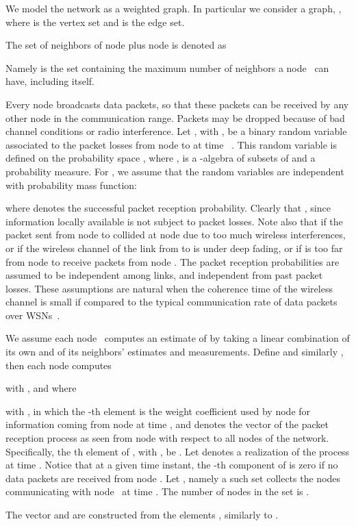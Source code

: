 \documentclass[a4paper,notitlepage,onecolumn]{article}
\numberwithin{equation}{section}
\begin{document}
We model the network as a weighted graph. In particular we consider
a graph, , where
 is the vertex set and
 is the edge set.


The set of neighbors of node  plus node  is
denoted as

Namely  is the set containing the maximum number of
neighbors a node~ can have, including itself.


Every node broadcasts data packets, so that these packets can be
received by any other node in the communication range. Packets may
be dropped because of bad channel conditions or radio
interference. Let , with , be a binary
random variable associated to the packet losses from node  to
 at time ~\cite{Stuber}. This random variable is defined on
the probability space , where
,  is a -algebra of subsets
of  and  a probability measure. For , we
assume that the random variables  are independent
with probability mass function:

where  denotes the successful packet reception
probability. Clearly that , since information locally
available is not subject to packet losses. Note also that
 if the packet sent from node  to  collided at
node  due to too much wireless interferences, or if the
wireless channel of the link from  to  is under deep fading,
or if  is too far from node  to receive packets from node
. The packet reception probabilities are assumed to be
independent among links, and independent from past packet losses.
These assumptions are natural when the coherence time of the
wireless channel is small if compared to the typical communication
rate of data packets over WSNs~\cite{Stuber,ieee802154}.


We assume each node~ computes an estimate  of
 by taking a linear combination of its own and of its
neighbors' estimates and measurements. Define  and similarly , then each node computes

with , and where

with , in which the -th element
is the weight coefficient used by node  for information coming
from node  at time , and  
denotes the vector of the packet reception process as seen from
node  with respect to all nodes of the network. Specifically,
the th element of , with , be
. Let  denotes a
realization of the process  at time . Notice that
at a given time instant, the -th component of 
is zero if no data packets are received from node . Let
, namely a such set collects the nodes communicating with
node~ at time . The number of nodes in the set is
.

The vector  and  are constructed from the elements , similarly to .
\end{document}
